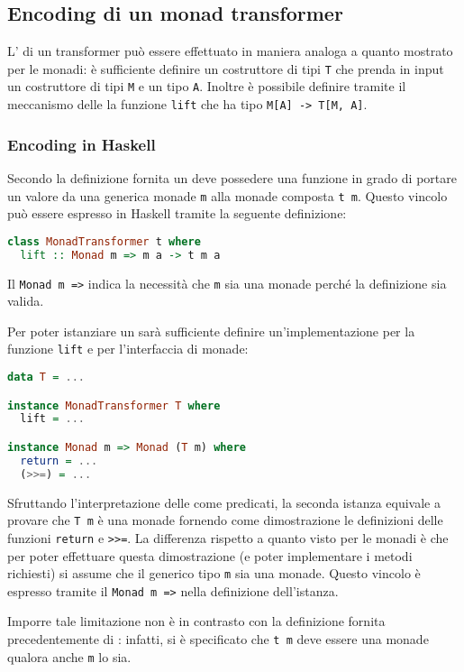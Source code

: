 \subsection{Encoding di un monad transformer}
L' di un transformer può essere effettuato in maniera analoga a quanto mostrato per le monadi: è sufficiente definire un costruttore di tipi \lstinline{T} che prenda in input un costruttore di tipi \lstinline{M} e un tipo \lstinline{A}. Inoltre è possibile definire tramite il meccanismo delle  la funzione \lstinline{lift} che ha tipo \lstinline{M[A] -> T[M, A]}.

\subsubsection{Encoding in Haskell}
Secondo la definizione fornita un  deve possedere una funzione in grado di portare un valore da una generica monade \lstinline{m} alla monade composta \lstinline{t m}. Questo vincolo può essere espresso in Haskell tramite la seguente definizione:
\begin{lstlisting}[language=haskell]
class MonadTransformer t where
  lift :: Monad m => m a -> t m a
\end{lstlisting}
Il  \lstinline{Monad m =>} indica la necessità che \lstinline{m} sia una monade perché la definizione sia valida.

Per poter istanziare un  sarà sufficiente definire un'implementazione per la funzione \lstinline{lift} e per l'interfaccia di monade:
\begin{lstlisting}[language=haskell]
data T = ...

instance MonadTransformer T where
  lift = ...

instance Monad m => Monad (T m) where
  return = ...
  (>>=) = ...
\end{lstlisting}
Sfruttando l'interpretazione delle  come predicati, la seconda istanza equivale a provare che \lstinline{T m} è una monade fornendo come dimostrazione le definizioni delle funzioni \lstinline{return} e \lstinline{>>=}. La differenza rispetto a quanto visto per le monadi è che per poter effettuare questa dimostrazione (e poter implementare i metodi richiesti) si assume che il generico tipo \lstinline{m} sia una monade. Questo vincolo è espresso tramite il  \lstinline{Monad m =>} nella definizione dell'istanza.

Imporre tale limitazione non è in contrasto con la definizione fornita precedentemente di : infatti, si è specificato che \lstinline{t m} deve essere una monade qualora anche \lstinline{m} lo sia.

